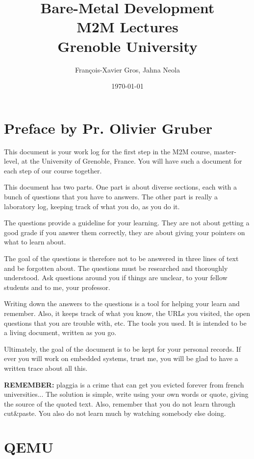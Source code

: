 \documentclass[10]{article}
\begin{document}
\title{Bare-Metal Development \\
M2M Lectures\\
Grenoble University}
\author{François-Xavier Gros, Jahna Neola}
\date{\today}
\maketitle

\section{Preface by Pr. Olivier Gruber}

This document is your work log for the first step in the 
M2M course, master-level, at the University of Grenoble, France.
You will have such a document for each step of our course
together.

This document has two parts. One part is about diverse
sections, each with a bunch of questions 
that you have to answers. The other part is really 
a laboratory log, keeping track of what you do, 
as you do it.

The questions provide a guideline for your learning. 
They are not about getting a good grade if you answer them
correctly, they are about giving your pointers on what to 
learn about.

The goal of the questions is therefore not to be answered 
in three lines of text and be forgotten about. The questions
must be researched and thoroughly understood. Ask questions
around you if things are unclear, to your fellow students
and to me, your professor. 

Writing down the answers to the questions is a tool for helping
your learn and remember. Also, it keeps track of what you know,
the URLs you visited, the open questions that you are trouble with,
etc. The tools you used. It is intended to be a living document,
written as you go.

Ultimately, the goal of the document is to be kept for 
your personal records. If ever you will work on embedded
systems, trust me, you will be glad to have a written 
trace about all this.

{\bf REMEMBER:} plaggia is a crime that can get you evicted
forever from french universities... The solution is simple,
write using your own words or quote, giving the source of
the quoted text. Also, remember that you do not learn through
cut\&paste. You also do not learn much by watching somebody else
doing.


\section{QEMU}
\end{document}
